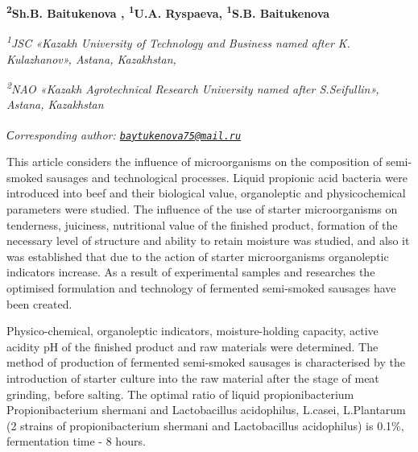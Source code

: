 
\begin{articleheader}

{\bfseries
\textsuperscript{2}Sh.B. Baitukenova\textsuperscript{\envelope } ,
\textsuperscript{1}U.A. Ryspaeva,
\textsuperscript{1}S.B. Baitukenova}
\end{articleheader}

\begin{affiliation}
\emph{\textsuperscript{1}JSC «Kazakh University of Technology and
Business named after K. Kulazhanov», Astana, Kazakhstan,}

\emph{\textsuperscript{2}NAO «Kazakh Agrotechnical Research University
named after S.Seifullin», Astana, Kazakhstan}

\raggedright {\bfseries \textsuperscript{\envelope }}{\em Сorresponding author: \href{mailto:baytukenova75@mail.ru}{\nolinkurl{baytukenova75@mail.ru}}}
\end{affiliation}

This article considers the influence of microorganisms on the
composition of semi-smoked sausages and technological processes. Liquid
propionic acid bacteria were introduced into beef and their biological
value, organoleptic and physicochemical parameters were studied. The
influence of the use of starter microorganisms on tenderness, juiciness,
nutritional value of the finished product, formation of the necessary
level of structure and ability to retain moisture was studied, and also
it was established that due to the action of starter microorganisms
organoleptic indicators increase. As a result of experimental samples
and researches the optimised formulation and technology of fermented
semi-smoked sausages have been created.

Physico-chemical, organoleptic indicators, moisture-holding capacity,
active acidity pH of the finished product and raw materials were
determined. The method of production of fermented semi-smoked sausages
is characterised by the introduction of starter culture into the raw
material after the stage of meat grinding, before salting. The optimal
ratio of liquid propionibacterium Propionibacterium shermani and
Lactobacillus acidophilus, L.casei, L.Plantarum (2 strains of
propionibacterium shermani and Lactobacillus acidophilus) is 0.1\%,
fermentation time - 8 hours.


